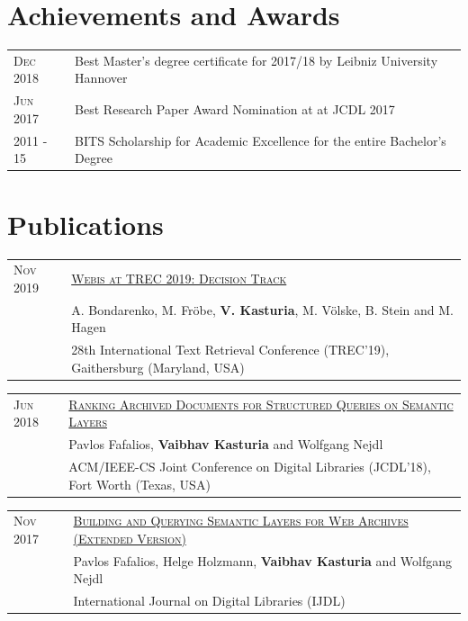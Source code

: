 \documentclass[a4paper,10pt]{article} %
\begin{document}
\section{Achievements and Awards}

\begin{tabular}{ll}
\textsc{Dec} 2018 & Best Master's degree certificate for 2017/18 by Leibniz University Hannover\\
\textsc{Jun} 2017 & Best Research Paper Award Nomination at at JCDL 2017\\
\textsc{2011 - 15} & BITS Scholarship for Academic Excellence for the entire Bachelor’s Degree\\
\end{tabular}


\section{Publications}

\begin{tabular}{ll}
\textsc{Nov 2019} & \href{https://webis.de/downloads/publications/papers/stein_2019zc.pdf}{\textsc{Webis at TREC 2019: Decision Track}}\\
& A. Bondarenko, M. Fröbe, \textbf{V. Kasturia}, M. Völske, B. Stein and M. Hagen \\
& 28th International Text Retrieval Conference (TREC'19), Gaithersburg (Maryland, USA)\\
\end{tabular}

\begin{tabular}{ll}
\textsc{Jun 2018} & \href{https://dl.acm.org/doi/10.1145/3197026.3197049}{\textsc{Ranking Archived Documents for Structured Queries on Semantic Layers}}\\
& Pavlos Fafalios, \textbf{Vaibhav Kasturia} and Wolfgang Nejdl\\
& ACM/IEEE-CS Joint Conference on Digital Libraries (JCDL’18), Fort Worth (Texas, USA)\\
\end{tabular}

\begin{tabular}{ll}
\textsc{Nov 2017} & \href{https://arxiv.org/abs/1810.10455}{\textsc{Building and Querying Semantic Layers for Web Archives (Extended Version)}}\\
& Pavlos Fafalios, Helge Holzmann, \textbf{Vaibhav Kasturia} and Wolfgang Nejdl\\
& International Journal on Digital Libraries (IJDL)\\
\end{tabular}
\end{document}

